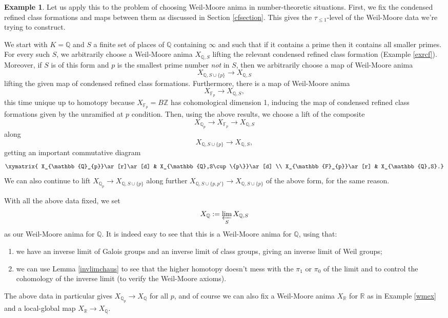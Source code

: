 \documentclass[12pt]{article}
\theoremstyle{definition}
\newtheorem{example}[theorem]{Example}
\newcommand{\mbb}{\mathbb}
\begin{document}
\begin{example}\label{compatiblewm}
Let us apply this to the problem of choosing Weil-Moore anima in number-theoretic situations.  First, we fix the condensed refined class formations and maps between them as discussed in Section \ref{cfsection}.  This gives the $\tau_{\leq 1}$-level of the Weil-Moore data we're trying to construct.

We start with $K=\mbb{Q}$ and $S$ a finite set of places of $\mbb{Q}$ containing $\infty$ and such that if it contains a prime then it contains all smaller primes.  For every such $S$, we arbitrarily choose a Weil-Moore anima $X_{\mbb{Q},S}$ lifting the relevant condensed refined class formation (Example \ref{exrcf}).  Moreover, if $S$ is of this form and $p$ is the smallest prime number \emph{not} in $S$, then we arbitrarily choose a map of Weil-Moore anima
$$X_{\mbb{Q},S\cup\{p\}} \to X_{\mbb{Q},S}$$
lifting the given map of condensed refined class formations.  Furthermore, there is a map of Weil-Moore anima
$$X_{\mbb{F}_{p}} \to X_{\mbb{Q},S},$$
this time unique up to homotopy because $X_{\mbb{F}_{p}}=B\mbb{Z}$ has cohomological dimension 1, inducing the map of condensed refined class formations given by the unramified at $p$ condition.  Then, using the above results, we choose a lift of the composite
$$X_{\mbb{Q}_{p}} \to X_{\mbb{F}_{p}}\to X_{\mbb{Q},S}$$
along
$$X_{\mbb{Q},S\cup\{p\}} \to X_{\mbb{Q},S},$$
getting an important commutative diagram
$$\xymatrix{
X_{\mbb{Q}_{p}}\ar[r]\ar[d] & X_{\mbb{Q},S\cup\{p\}}\ar[d] \\
X_{\mbb{F}_{p}}\ar[r] & X_{\mbb{Q},S}.}$$
We can also continue to lift $X_{\mbb{Q}_{p}}\to X_{\mbb{Q},S\cup\{p\}}$ along further $X_{\mbb{Q},S\cup\{p,p'\}}\to X_{\mbb{Q},S\cup\{p\}}$ of the above form, for the same reason.

With all the above data fixed, we set
$$X_\mbb{Q} := \varprojlim_S X_{\mbb{Q},S}$$
as our Weil-Moore anima for $\mbb{Q}$.  It is indeed easy to see that this is a Weil-Moore anima for $\mbb{Q}$, using that:
\begin{enumerate}
\item we have an inverse limit of Galois groups and an inverse limit of class groups, giving an inverse limit of Weil groups;
\item we can use Lemma \ref{invlimchaus} to see that the higher homotopy doesn't mess with the $\pi_1$ or $\pi_0$ of the limit and to control the cohomology of the inverse limit (to verify the Weil-Moore axioms).
\end{enumerate}
The above data in particular gives $X_{\mbb{Q}_p} \to X_{\mbb{Q}}$ for all $p$, and of course we can also fix a Weil-Moore anima $X_{\mbb{R}}$ for $\mbb{R}$ as in Example \ref{wmex} and a local-global map $X_{\mbb{R}}\to X_{\mbb{Q}}$.


\end{example}
\end{document}
